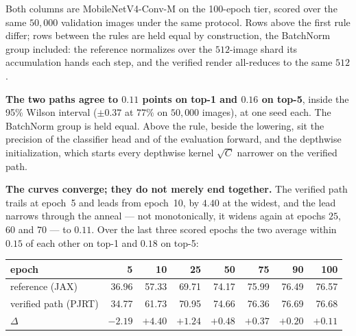 \noindent Both columns are MobileNetV4-Conv-M on the 100-epoch tier,
scored over the same $50{,}000$ validation images under the same
protocol. Rows above the first rule differ; rows between the rules are
held equal by construction, the BatchNorm group included: the reference
normalizes over the $512$-image shard its accumulation hands each step,
and the verified render all-reduces to the same $512$.

\medskip\noindent\textbf{The two paths agree to $0.11$ points on top-1
and $0.16$ on top-5}, inside the 95\% Wilson interval ($\pm0.37$ at $77\%$ on $50{,}000$ images), at one seed each. The
BatchNorm group is held equal. Above the rule, beside the lowering, sit
the precision of the classifier head and of the evaluation forward, and
the depthwise initialization, which starts every depthwise kernel
$\sqrt{C}$ narrower on the verified path.

\medskip\noindent\textbf{The curves converge; they do not merely end
together.} The verified path trails at epoch~5 and leads from epoch~10,
by $4.40$ at the widest, and the lead narrows through the anneal ---
not monotonically, it widens again at epochs $25$, $60$ and $70$ ---
to $0.11$. Over the last three scored epochs the two average within
$0.15$ of each other on top-1 and $0.18$ on top-5:

\begin{center}
\begin{tabular}{@{}l r r r r r r r@{}}
\hline
epoch & 5 & 10 & 25 & 50 & 75 & 90 & 100 \\
\hline
reference (JAX)       & 36.96 & 57.33 & 69.71 & 74.17 & 75.99 & 76.49 & 76.57 \\
verified path (PJRT)  & 34.77 & 61.73 & 70.95 & 74.66 & 76.36 & 76.69 & 76.68 \\
$\Delta$              & $-2.19$ & $+4.40$ & $+1.24$ & $+0.48$ & $+0.37$ & $+0.20$ & $+0.11$ \\
\hline
\end{tabular}
\end{center}

